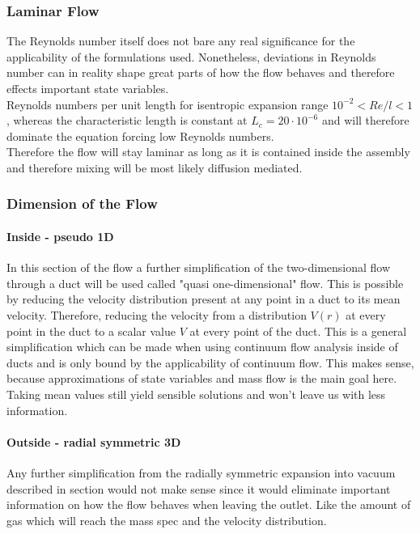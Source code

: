\subsubsection{Laminar Flow}

	The Reynolds number itself does not bare any real significance for the applicability of the formulations used. Nonetheless, deviations in Reynolds number can in reality shape great parts of how the flow behaves and therefore effects important state variables.\\
	Reynolds numbers per unit length for isentropic expansion range $10^{-2} < Re/l < 1$, whereas the characteristic length is constant at $L_c = 20\cdot 10^{-6}$ and will therefore dominate the equation forcing low Reynolds numbers. \cite{ames1953compressible}\\
	Therefore the flow will stay laminar as long as it is contained inside the assembly and therefore mixing will be most likely diffusion mediated.
	\cite{comsol_microfluidics_guide}
	
\subsubsection{Dimension of the Flow}

	\paragraph{Inside - pseudo 1D}

		In this section of the flow a further simplification of the two-dimensional flow through a duct will be used called "quasi one-dimensional" flow.
		This is possible by reducing the velocity distribution present at any point in a duct to its mean velocity.
		Therefore, reducing the velocity from a distribution $V(r)$ at every point in the duct to a scalar value $V$ at every point of the duct.
		This is a general simplification which can be made when using continuum flow analysis inside of ducts and is only bound by the applicability of continuum flow.
		This makes sense, because approximations of state variables and mass flow is the main goal here.
		Taking mean values still yield sensible solutions and won't leave us with less information.

	\paragraph{Outside - radial symmetric 3D}

		Any further simplification from the radially symmetric expansion into vacuum described in section would not make sense since it would eliminate important information on how the flow behaves when leaving the outlet.
		Like the amount of gas which will reach the mass spec and the velocity distribution.
\cite{anderson2021modern}

